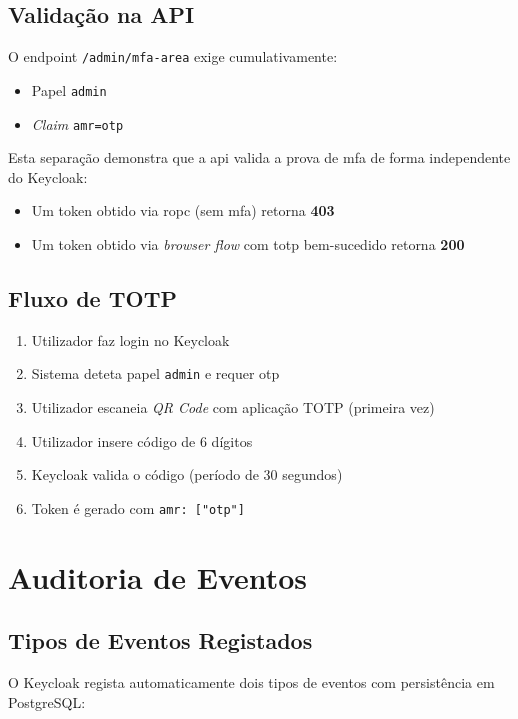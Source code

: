 \subsection{Validação na API}

O endpoint \texttt{/admin/mfa-area} exige cumulativamente:
\begin{itemize}
  \item Papel \texttt{admin}
  \item \textit{Claim} \texttt{amr=otp}
\end{itemize}

Esta separação demonstra que a \gls{api} valida a prova de \gls{mfa} de forma independente do Keycloak:
\begin{itemize}
  \item Um token obtido via \gls{ropc} (sem \gls{mfa}) retorna \textbf{403}
  \item Um token obtido via \textit{browser flow} com \gls{totp} bem-sucedido retorna \textbf{200}
\end{itemize}

\subsection{Fluxo de TOTP}

\begin{enumerate}
  \item Utilizador faz login no Keycloak
  \item Sistema deteta papel \texttt{admin} e requer \gls{otp}
  \item Utilizador escaneia \textit{QR Code} com aplicação TOTP (primeira vez)
  \item Utilizador insere código de 6 dígitos
  \item Keycloak valida o código (período de 30 segundos)
  \item Token é gerado com \texttt{amr: ["otp"]}
\end{enumerate}

\section{Auditoria de Eventos}

\subsection{Tipos de Eventos Registados}

O Keycloak regista automaticamente dois tipos de eventos com persistência em PostgreSQL:

